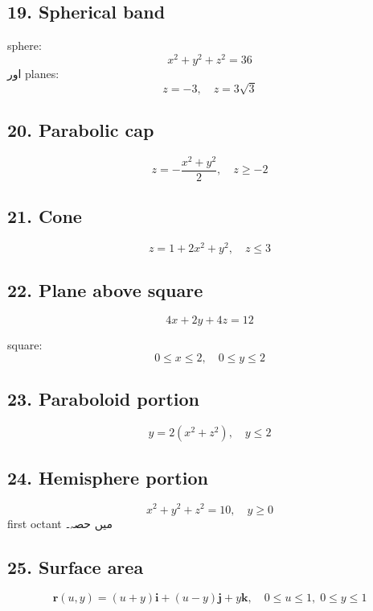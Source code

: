 \begin{enumerate}
\subsection*{19. Spherical band}

sphere:
\[
x^2 + y^2 + z^2 = 36
\]
اور planes:
\[
z = -3,\quad z = 3\sqrt{3}
\]

\bigskip

\subsection*{20. Parabolic cap}

\[
z = -\frac{x^2 + y^2}{2},\quad z \ge -2
\]

\bigskip

\subsection*{21. Cone}

\[
z = 1 + 2x^2 + y^2,\quad z \le 3
\]

\bigskip

\subsection*{22. Plane above square}

\[
4x + 2y + 4z = 12
\]

square:
\[
0 \le x \le 2,\quad 0 \le y \le 2
\]

\bigskip

\subsection*{23. Paraboloid portion}

\[
y = 2(x^2 + z^2),\quad y \le 2
\]

\bigskip

\subsection*{24. Hemisphere portion}

\[
x^2 + y^2 + z^2 = 10,\quad y \ge 0
\]
first octant میں حصہ۔

\bigskip

\subsection*{25. Surface area}

\[
\mathbf{r}(u,y) =
(u+y)\mathbf{i} + (u-y)\mathbf{j} + y\mathbf{k},\quad
0 \le u \le 1,\; 0 \le y \le 1
\]


\end{enumerate}

